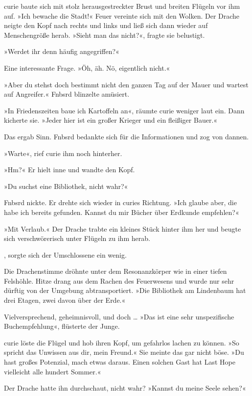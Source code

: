 curie baute sich mit stolz herausgestreckter Brust und breiten Flügeln vor ihm auf. »Ich bewache die Stadt!« Feuer vereinte sich mit den Wolken. Der Drache neigte den Kopf nach rechts und links und ließ sich dann wieder auf Menschengröße herab. »Sieht man das nicht?«, fragte sie belustigt.

»Werdet ihr denn häufig angegriffen?«

Eine interessante Frage. »Öh, äh. Nö, eigentlich nicht.«

»Aber du stehst doch bestimmt nicht den ganzen Tag auf der Mauer und wartest auf Angreifer.« Fnbsrd blinzelte amüsiert.

»In Friedenszeiten baue ich Kartoffeln an«, räumte curie weniger laut ein. Dann kicherte sie. »Jeder hier ist ein großer Krieger und ein fleißiger Bauer.«

Das ergab Sinn. Fnbsrd bedankte sich für die Informationen und zog von dannen.

»Warte«, rief curie ihm noch hinterher.

»Hm?« Er hielt inne und wandte den Kopf.

»Du suchst eine Bibliothek, nicht wahr?«

Fnbsrd nickte. Er drehte sich wieder in curies Richtung. »Ich glaube aber, die habe ich bereits gefunden. Kannst du mir Bücher über Erdkunde empfehlen?«

»Mit Verlaub.« Der Drache trabte ein kleines Stück hinter ihm her und beugte sich verschwörerisch unter Flügeln zu ihm herab.

, sorgte sich der Umschlossene ein wenig.

Die Drachenstimme dröhnte unter dem Resonanzkörper wie in einer tiefen Felshöhle. Hitze drang aus dem Rachen des Feuerwesens und wurde nur sehr dürftig von der Umgebung abtransportiert. »Die Bibliothek am Lindenbaum hat drei Etagen, zwei davon über der Erde.«

Vielversprechend, geheimnisvoll, und doch … »Das ist eine sehr unspezifische Buchempfehlung«, flüsterte der Junge.

curie löste die Flügel und hob ihren Kopf, um gefahrlos lachen zu können. »So spricht das Unwissen aus dir, mein Freund.« Sie meinte das gar nicht böse. »Du hast großes Potenzial, mach etwas daraus. Einen solchen Gast hat Last Hope vielleicht alle hundert Sommer.«

Der Drache hatte ihn durchschaut, nicht wahr? »Kannst du meine Seele sehen?«

